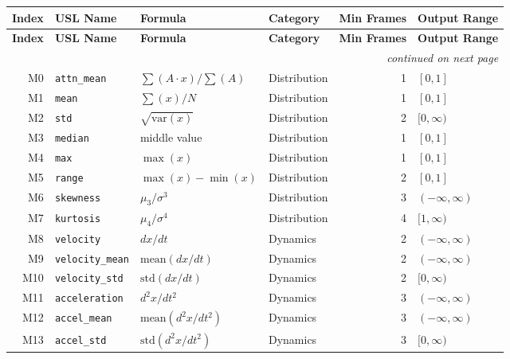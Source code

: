 \begin{longtable}{
  r
  l
  l
  l
  r
  l
}
\toprule
\textbf{Index} & \textbf{USL Name} & \textbf{Formula} & \textbf{Category} & \textbf{Min Frames} & \textbf{Output Range} \\
\midrule
\endfirsthead

\toprule
\textbf{Index} & \textbf{USL Name} & \textbf{Formula} & \textbf{Category} & \textbf{Min Frames} & \textbf{Output Range} \\
\midrule
\endhead

\midrule
\multicolumn{6}{r}{\footnotesize\itshape continued on next page} \\
\endfoot

\bottomrule
\endlastfoot

\rowcolor{cyan!8}
M0  & \texttt{attn\_mean}    & $\sum(A \cdot x)/\sum(A)$                 & Distribution & 1 & $[0,1]$      \\
\rowcolor{cyan!8}
M1  & \texttt{mean}          & $\sum(x)/N$                               & Distribution & 1 & $[0,1]$      \\
\rowcolor{cyan!8}
M2  & \texttt{std}           & $\sqrt{\mathrm{var}(x)}$                  & Distribution & 2 & $[0,\infty)$ \\
\rowcolor{cyan!8}
M3  & \texttt{median}        & middle value                              & Distribution & 1 & $[0,1]$      \\
\rowcolor{cyan!8}
M4  & \texttt{max}           & $\max(x)$                                 & Distribution & 1 & $[0,1]$      \\
\rowcolor{cyan!8}
M5  & \texttt{range}         & $\max(x) - \min(x)$                       & Distribution & 2 & $[0,1]$      \\
\rowcolor{cyan!8}
M6  & \texttt{skewness}      & $\mu_3 / \sigma^3$                        & Distribution & 3 & $(-\infty,\infty)$ \\
\rowcolor{cyan!8}
M7  & \texttt{kurtosis}      & $\mu_4 / \sigma^4$                        & Distribution & 4 & $[1,\infty)$ \\

\rowcolor{orange!8}
M8  & \texttt{velocity}      & $dx/dt$                                   & Dynamics     & 2 & $(-\infty,\infty)$ \\
\rowcolor{orange!8}
M9  & \texttt{velocity\_mean} & $\mathrm{mean}(dx/dt)$                   & Dynamics     & 2 & $(-\infty,\infty)$ \\
\rowcolor{orange!8}
M10 & \texttt{velocity\_std}  & $\mathrm{std}(dx/dt)$                    & Dynamics     & 2 & $[0,\infty)$ \\
\rowcolor{orange!8}
M11 & \texttt{acceleration}   & $d^2x/dt^2$                              & Dynamics     & 3 & $(-\infty,\infty)$ \\
\rowcolor{orange!8}
M12 & \texttt{accel\_mean}    & $\mathrm{mean}(d^2x/dt^2)$              & Dynamics     & 3 & $(-\infty,\infty)$ \\
\rowcolor{orange!8}
M13 & \texttt{accel\_std}     & $\mathrm{std}(d^2x/dt^2)$               & Dynamics     & 3 & $[0,\infty)$ \\


\end{longtable}
